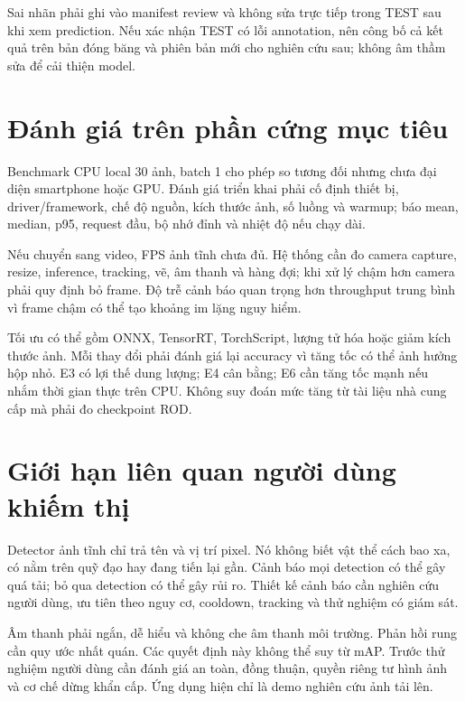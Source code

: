 \documentclass[12pt,a4paper,oneside]{report}
\begin{document}
Sai nhãn phải ghi vào manifest review và không sửa trực tiếp trong TEST sau khi xem prediction. Nếu xác nhận TEST có lỗi annotation, nên công bố cả kết quả trên bản đóng băng và phiên bản mới cho nghiên cứu sau; không âm thầm sửa để cải thiện model.

\section{Đánh giá trên phần cứng mục tiêu}
Benchmark CPU local 30 ảnh, batch 1 cho phép so tương đối nhưng chưa đại diện smartphone hoặc GPU. Đánh giá triển khai phải cố định thiết bị, driver/framework, chế độ nguồn, kích thước ảnh, số luồng và warmup; báo mean, median, p95, request đầu, bộ nhớ đỉnh và nhiệt độ nếu chạy dài.

Nếu chuyển sang video, FPS ảnh tĩnh chưa đủ. Hệ thống cần đo camera capture, resize, inference, tracking, vẽ, âm thanh và hàng đợi; khi xử lý chậm hơn camera phải quy định bỏ frame. Độ trễ cảnh báo quan trọng hơn throughput trung bình vì frame chậm có thể tạo khoảng im lặng nguy hiểm.

Tối ưu có thể gồm ONNX, TensorRT, TorchScript, lượng tử hóa hoặc giảm kích thước ảnh. Mỗi thay đổi phải đánh giá lại accuracy vì tăng tốc có thể ảnh hưởng hộp nhỏ. E3 có lợi thế dung lượng; E4 cân bằng; E6 cần tăng tốc mạnh nếu nhắm thời gian thực trên CPU. Không suy đoán mức tăng từ tài liệu nhà cung cấp mà phải đo checkpoint ROD.

\section{Giới hạn liên quan người dùng khiếm thị}
Detector ảnh tĩnh chỉ trả tên và vị trí pixel. Nó không biết vật thể cách bao xa, có nằm trên quỹ đạo hay đang tiến lại gần. Cảnh báo mọi detection có thể gây quá tải; bỏ qua detection có thể gây rủi ro. Thiết kế cảnh báo cần nghiên cứu người dùng, ưu tiên theo nguy cơ, cooldown, tracking và thử nghiệm có giám sát.

Âm thanh phải ngắn, dễ hiểu và không che âm thanh môi trường. Phản hồi rung cần quy ước nhất quán. Các quyết định này không thể suy từ mAP. Trước thử nghiệm người dùng cần đánh giá an toàn, đồng thuận, quyền riêng tư hình ảnh và cơ chế dừng khẩn cấp. Ứng dụng hiện chỉ là demo nghiên cứu ảnh tải lên.
\end{document}
